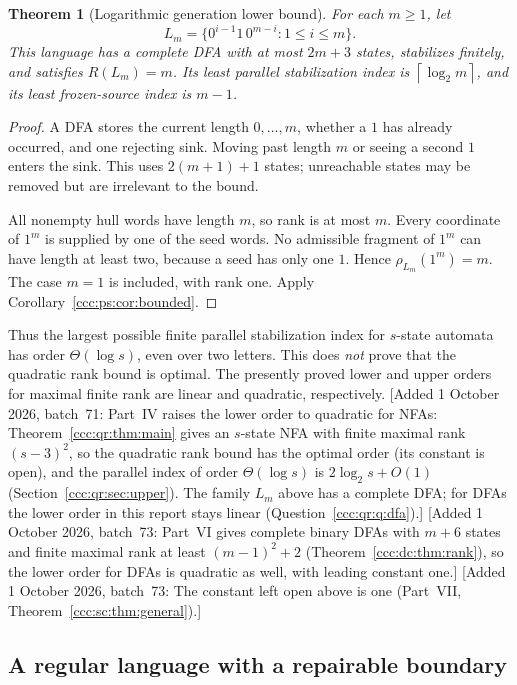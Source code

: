 \documentclass[11pt,letterpaper]{article}
\newtheorem{theorem}{Theorem}[section]
\theoremstyle{definition}
\theoremstyle{remark}
\newcommand{\rank}{\rho}
\newcommand{\clog}[1]{\left\lceil\log_2 #1\right\rceil}
\newcommand{\waddsevone}[1]{\textup{[}Added 1 October 2026, batch~71: #1\textup{]}}
\newcommand{\waddsevthree}[1]{\textup{[}Added 1 October 2026, batch~73: #1\textup{]}}
\begin{document}
\begin{theorem}[Logarithmic generation lower bound]\label{ccc:ps:thm:lower-family}
For each $m\ge1$, let
\[
 L_m=\{0^{i-1}1\,0^{m-i}:1\le i\le m\}.
\]
This language has a complete DFA with at most $2m+3$ states, stabilizes
finitely, and satisfies $R(L_m)=m$. Its least parallel stabilization index
is $\clog m$, and its least frozen-source index is $m-1$.
\end{theorem}
\begin{proof}
A DFA stores the current length $0,\ldots,m$, whether a $1$ has already
occurred, and one rejecting sink. Moving past length $m$ or seeing a
second $1$ enters the sink. This uses $2(m+1)+1$ states; unreachable
states may be removed but are irrelevant to the bound.

All nonempty hull words have length $m$, so rank is at most $m$.
Every coordinate of $1^m$ is supplied by one of the seed words. No
admissible fragment of $1^m$ can have length at least two, because a
seed has only one $1$. Hence $\rank_{L_m}(1^m)=m$. The case $m=1$
is included, with rank one. Apply Corollary~\ref{ccc:ps:cor:bounded}.
\end{proof}

Thus the largest possible finite parallel stabilization index for
$s$-state automata has order $\Theta(\log s)$, even over two letters.
This does \emph{not} prove that the quadratic rank bound is optimal.
The presently proved lower and upper orders for maximal finite rank are
linear and quadratic, respectively.
\waddsevone{Part~IV raises the lower order to quadratic for NFAs:
Theorem~\ref{ccc:qr:thm:main} gives an $s$-state NFA with finite maximal
rank $(s-3)^2$, so the quadratic rank bound has the optimal order (its
constant is open), and the parallel index of order $\Theta(\log s)$ is
$2\log_2s+O(1)$ (Section~\ref{ccc:qr:sec:upper}). The family $L_m$ above has
a complete DFA; for DFAs the lower order in this report stays linear
(Question~\ref{ccc:qr:q:dfa}).}
\waddsevthree{Part~VI gives complete binary DFAs with $m+6$ states and
finite maximal rank at least $(m-1)^2+2$ (Theorem~\ref{ccc:dc:thm:rank}), so
the lower order for DFAs is quadratic as well, with leading constant one.}
\waddsevthree{The constant left open above is one (Part~VII,
Theorem~\ref{ccc:sc:thm:general}).}

\subsection{A regular language with a repairable boundary}
\end{document}

